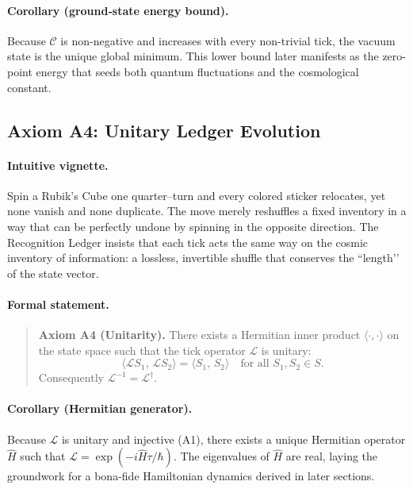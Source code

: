 \documentclass[11pt]{article}
\begin{document}
\paragraph{Corollary (ground‐state energy bound).}
Because \(\mathcal{C}\) is non-negative and increases with every non-trivial tick, the vacuum state is the unique global minimum.  This lower bound later manifests as the zero-point energy that seeds both quantum fluctuations and the cosmological constant.
\subsection{Axiom A4: Unitary Ledger Evolution}
\label{subsec:axiom-a4}

\paragraph{Intuitive vignette.}
Spin a Rubik’s Cube one quarter–turn and every colored sticker relocates, yet none vanish and none duplicate.  The move merely reshuffles a fixed inventory in a way that can be perfectly undone by spinning in the opposite direction.  The Recognition Ledger insists that each tick acts the same way on the cosmic inventory of information: a lossless, invertible shuffle that conserves the “length’’ of the state vector.

\paragraph{Formal statement.}
\begin{quote}
\textbf{Axiom A4 (Unitarity).}  
There exists a Hermitian inner product \(\langle\!\cdot,\!\cdot\rangle\) on the state space such that the tick operator \(\mathcal{L}\) is unitary:
\[
\langle \mathcal{L}S_{1},\,\mathcal{L}S_{2}\rangle = 
\langle S_{1},\,S_{2}\rangle
\quad\text{for all } S_{1},S_{2}\in S.
\]
Consequently \(\mathcal{L}^{-1} = \mathcal{L}^{\dagger}\).
\end{quote}

\paragraph{Corollary (Hermitian generator).}
Because \(\mathcal{L}\) is unitary and injective (A1), there exists a unique Hermitian operator \(\widehat{H}\) such that \(\mathcal{L} = \exp(-i\widehat{H}\tau/\hbar)\).  The eigenvalues of \(\widehat{H}\) are real, laying the groundwork for a bona-fide Hamiltonian dynamics derived in later sections.
\end{document}
